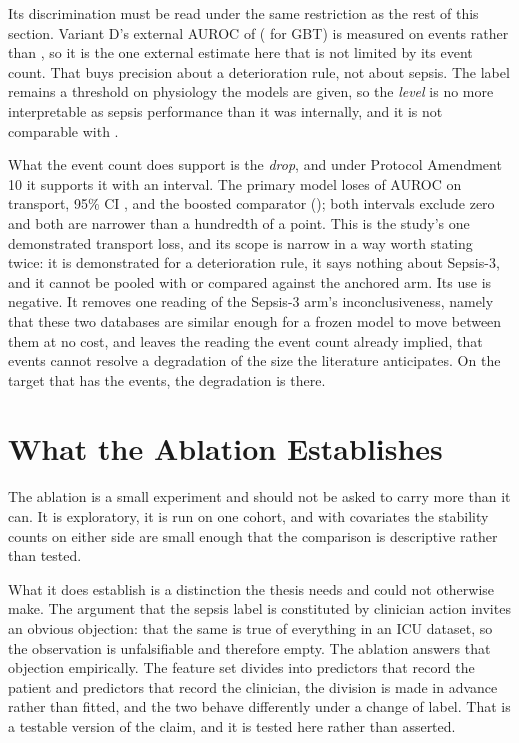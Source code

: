 Its discrimination must be read under the same restriction as the rest of this
section. Variant D's external AUROC of \pcExtAltAurocPrimary{}
(\pcExtAltAurocGbt{} for GBT) is measured on \pcExtAltNEvents{} events rather
than \pcExtNEventsB, so it is the one external estimate here that is not
limited by its event count. That buys precision about a deterioration rule, not
about sepsis. The label remains a threshold on physiology the models are given,
so the \emph{level} is no more interpretable as sepsis performance than it was
internally, and it is not comparable with \pcExtAurocPrimaryB.

What the event count does support is the \emph{drop}, and under Protocol
Amendment 10 it supports it with an interval. The primary model loses
\pcExtAltDropPrimary{} of AUROC on transport, 95\% CI
\pcExtAltDropCiPrimary, and the boosted comparator \pcExtAltDropGbt{}
(\pcExtAltDropCiGbt); both intervals exclude zero and both are narrower than a
hundredth of a point. This is the study's one demonstrated transport loss, and
its scope is narrow in a way worth stating twice: it is demonstrated for a
deterioration rule, it says nothing about Sepsis-3, and it cannot be pooled
with or compared against the anchored arm. Its use is negative. It removes one
reading of the Sepsis-3 arm's inconclusiveness, namely that these two databases
are similar enough for a frozen model to move between them at no cost, and
leaves the reading the event count already implied, that
\pcExtNEventsB{} events cannot resolve a degradation of the size the
literature anticipates. On the target that has the events, the degradation is
there.


\section{What the Ablation Establishes}
\label{sec:ablation_establishes}

The ablation is a small experiment and should not be asked to carry more than
it can. It is exploratory, it is run on one cohort, and with \pcHTwoNTerms{}
covariates the stability counts on either side are small enough that the
comparison is descriptive rather than tested.

What it does establish is a distinction the thesis needs and could not
otherwise make. The argument that the sepsis label is constituted by clinician
action invites an obvious objection: that the same is true of everything in an
ICU dataset, so the observation is unfalsifiable and therefore empty. The
ablation answers that objection empirically. The feature set divides into
predictors that record the patient and predictors that record the clinician,
the division is made in advance rather than fitted, and the two behave
differently under a change of label. That is a testable version of the claim,
and it is tested here rather than asserted.

